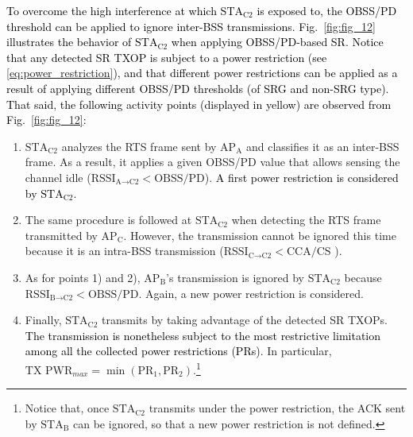\documentclass[preprint,12pt]{elsarticle}
\begin{document}
\textcolor{black}{To overcome the high interference at which $\text{STA}_\text{C2}$ is exposed to, the OBSS/PD threshold can be applied to ignore inter-BSS transmissions. Fig.~\ref{fig:fig_12} illustrates the behavior of $\text{STA}_\text{C2}$ when applying OBSS/PD-based SR. Notice that any detected SR TXOP is subject to a power restriction (see \eqref{eq:power_restriction}), and that different power restrictions can be applied as a result of applying different OBSS/PD thresholds (of SRG and non-SRG type). That said, the following activity points (displayed in yellow) are observed from Fig.~\ref{fig:fig_12}:}
\begin{enumerate}
	\item $\text{STA}_\text{C2}$ analyzes the RTS frame sent by $\text{AP}_\text{A}$ and classifies it as an inter-BSS frame. As a result, it applies a given OBSS/PD value that allows sensing the channel idle ($\text{RSSI}_{\text{A} \rightarrow \text{C2}} < \text{OBSS/PD}$). \textcolor{black}{A first power restriction is considered by $\text{STA}_\text{C2}$.}
	\item The same procedure is followed at $\text{STA}_\text{C2}$ when detecting the RTS frame transmitted by $\text{AP}_\text{C}$. However, the transmission cannot be ignored this time because it is an intra-BSS transmission ($\text{RSSI}_{\text{C} \rightarrow \text{C2}} < \text{CCA/CS}$ ).
	\item As for points 1) and 2), $\text{AP}_\text{B}$'s transmission is ignored by $\text{STA}_\text{C2}$ because $\text{RSSI}_{\text{B} \rightarrow \text{C2}} < \text{OBSS/PD}$. Again, a new power restriction is considered.
	\item Finally, $\text{STA}_\text{C2}$ transmits by taking advantage of the detected SR TXOPs. \textcolor{black}{The transmission is nonetheless subject to the most restrictive limitation among all the collected power restrictions (PRs)}. In particular, $\text{TX PWR}_{max} = \min(\text{PR}_1, \text{PR}_2)$.\footnote{Notice that, once $\text{STA}_\text{C2}$ transmits under the power restriction, the ACK sent by $\text{STA}_\text{B}$ can be ignored, so that a new power restriction is not defined.}
\end{enumerate}
\end{document}
